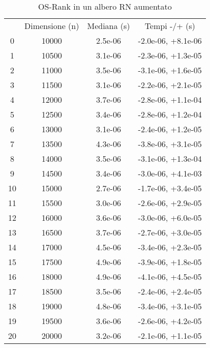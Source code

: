 \begin{table}
\centering
\caption{OS-Rank in un albero RN aumentato}
\label{OS-Rank in un albero RN aumentato}
\begin{adjustbox}{width=1\textwidth/2}
\begin{tabular}{|c|c|c|c|}
\hline
 & Dimensione (n) & Mediana (s) & Tempi -/+ (s) \\
0 & 10000 & 2.5e-06 & -2.0e-06, +8.1e-06 \\
\cline{1-4}
1 & 10500 & 3.1e-06 & -2.3e-06, +1.3e-05 \\
\cline{1-4}
2 & 11000 & 3.5e-06 & -3.1e-06, +1.6e-05 \\
\cline{1-4}
3 & 11500 & 3.1e-06 & -2.2e-06, +2.1e-05 \\
\cline{1-4}
4 & 12000 & 3.7e-06 & -2.8e-06, +1.1e-04 \\
\cline{1-4}
5 & 12500 & 3.4e-06 & -2.8e-06, +1.2e-04 \\
\cline{1-4}
6 & 13000 & 3.1e-06 & -2.4e-06, +1.2e-05 \\
\cline{1-4}
7 & 13500 & 4.3e-06 & -3.8e-06, +3.1e-05 \\
\cline{1-4}
8 & 14000 & 3.5e-06 & -3.1e-06, +1.3e-04 \\
\cline{1-4}
9 & 14500 & 3.4e-06 & -3.0e-06, +4.1e-03 \\
\cline{1-4}
10 & 15000 & 2.7e-06 & -1.7e-06, +3.4e-05 \\
\cline{1-4}
11 & 15500 & 3.0e-06 & -2.6e-06, +2.9e-05 \\
\cline{1-4}
12 & 16000 & 3.6e-06 & -3.0e-06, +6.0e-05 \\
\cline{1-4}
13 & 16500 & 3.7e-06 & -2.7e-06, +3.0e-05 \\
\cline{1-4}
14 & 17000 & 4.5e-06 & -3.4e-06, +2.3e-05 \\
\cline{1-4}
15 & 17500 & 4.9e-06 & -3.9e-06, +1.8e-05 \\
\cline{1-4}
16 & 18000 & 4.9e-06 & -4.1e-06, +4.5e-05 \\
\cline{1-4}
17 & 18500 & 3.5e-06 & -2.4e-06, +2.4e-05 \\
\cline{1-4}
18 & 19000 & 4.8e-06 & -3.4e-06, +3.1e-05 \\
\cline{1-4}
19 & 19500 & 3.6e-06 & -2.6e-06, +4.2e-05 \\
\cline{1-4}
20 & 20000 & 3.2e-06 & -2.1e-06, +1.1e-05 \\
\cline{1-4}
\end{tabular}
\end{adjustbox}
\end{table}
